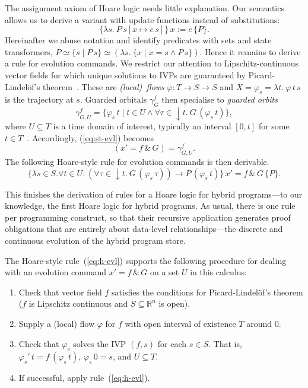 \documentclass[envcountsames]{llncs}
\newcommand{\flow}{\varphi}
\newcommand{\reals}{\mathbb{R}}
\begin{document}
The assignment axiom of Hoare logic needs little explanation. Our
semantics allows us to derive a variant with update functions instead
of substitutions:
\begin{equation}
\{\lambda s.\ P\, s[x\mapsto e\, s]\}\,  x:=e\, \{P\}. \label{eq:h-assgn}\tag{h-assgn}
\end{equation}
Hereinafter we abuse notation and identify predicates with sets and state 
transformers, $P\simeq \{s\mid P\, s\}\simeq (\lambda s.\ \{x\mid x=s \land P\, s\})$.
Hence it remains to derive a rule for evolution commands.  We restrict
our attention to Lipschitz-continuous vector fields for which unique
solutions to IVPs are guaranteed by Picard-Lindel\"of's
theorem~\cite{Hirsch09,Teschl12}.  These are \emph{(local)\ flows}
$\flow:T\to S\to S$ and $X=\flow_s=\lambda t.\ \flow\, t\, s$ is the
trajectory at $s$. Guarded orbitals $\gamma^f_G$  then specialise to
\emph{guarded orbits}
\begin{equation*}
  \gamma^f_{G,U} = \{\flow_s\, t\mid t\in U\land \forall\tau \in
  {\downarrow}t.\ G\, (\flow_s\, t)\},
\end{equation*}
where $U\subseteq T$ is a time domain of interest, typically an
interval $[0,t]$ for some $t\in T$~\cite{MuniveS19}.  Accordingly,
(\ref{eq:st-evl}) becomes
\begin{equation}
  (x' = f\, \&\, G)= \gamma^f_{G,U}.\label{eq:st-evl-flow}\tag{st-evl-flow}
\end{equation}
The following Hoare-style rule for evolution commands is then
derivable.
\begin{equation}
\{\lambda s\in S.\forall t\in U.\ (\forall
\tau\in {\downarrow}t.\ G\, (\flow_s\, \tau)) \rightarrow P\,
(\flow_s\, t)\}\, x' = f\, \&\, G\, \{P\}. \label{eq:h-evl}\tag{h-evl}
\end{equation}

This finishes the derivation of rules for a Hoare logic for hybrid
programs---to our knowledge, the first Hoare logic for hybrid
programs. As usual, there is one rule per programming construct, so
that their recursive application generates proof obligations that are
entirely about data-level relationships---the discrete and continuous
evolution of the hybrid program store.

The Hoare-style rule~(\ref{eq:h-evl}) supports the following procedure for dealing with an evolution command $x' = f\, \&\, G$ on a set $U$ in this calculus:
\begin{enumerate}
\item Check that vector field $f$ satisfies the conditions for Picard-Lindel\"of's theorem ($f$ is Lipschitz continuous and $S\subseteq\reals^n$ is open).
\item Supply a (local) flow $\flow$ for $f$ with open interval of existence $T$ around $0$.
\item Check that $\flow_s$ solves the IVP $(f,s)$ for each $s\in S$. That is, $\flow_s'\, t = f\, (\flow_s\, t)$,  $\flow_s\, 0 = s$, and $U\subseteq T$.
\item If successful, apply rule~(\ref{eq:h-evl}).
\end{enumerate}
\end{document}

